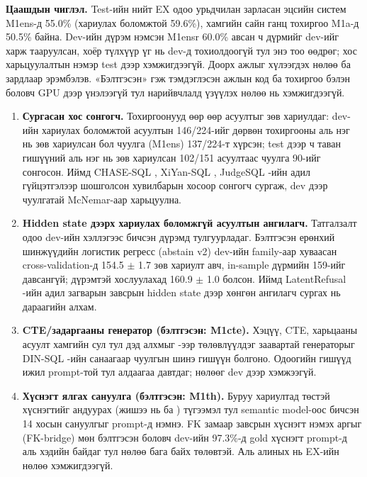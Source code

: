\textbf{Цаашдын чиглэл.} Test-ийн нийт EX одоо урьдчилан зарласан эцсийн систем M1ens-д 55.0\% (хариулах боломжтой
59.6\%), хамгийн сайн ганц тохиргоо M1a-д 50.5\% байна. Dev-ийн дүрэм нэмсэн M1ensr 60.0\% авсан ч дүрмийг dev-ийг харж
тааруулсан, хоёр түлхүүр үг нь dev-д тохиолдоогүй тул энэ тоо өөдрөг; хос харьцуулалтын нэмэр test дээр хэмжигдээгүй.
Доорх ажлыг хүлээгдэх нөлөө ба зардлаар эрэмбэлэв.
«Бэлтгэсэн» гэж тэмдэглэсэн ажлын код ба тохиргоо бэлэн боловч GPU дээр үнэлээгүй тул нарийвчлалд үзүүлэх нөлөө нь
хэмжигдээгүй.
\begin{enumerate}
  \item \textbf{Сургасан хос сонгогч.} Тохиргоонууд өөр өөр асуултыг зөв хариулдаг: dev-ийн хариулах боломжтой асуултын
        146/224-ийг дөрвөн тохиргооны аль нэг нь зөв хариулсан бол чуулга (M1ens) 137/224-т хүрсэн; test дээр ч таван
        гишүүний аль нэг нь зөв хариулсан 102/151 асуултаас чуулга 90-ийг сонгосон. Иймд CHASE-SQL
        \cite{pourreza_2024_chase_sql}, XiYan-SQL \cite{liu_2025_xiyan_sql}, JudgeSQL \cite{bai_2025_judgesql}-ийн адил
        гүйцэтгэлээр шошголсон хувилбарын хосоор сонгогч сургаж, dev дээр чуулгатай McNemar-аар харьцуулна.
  \item \textbf{Hidden state дээрх хариулах боломжгүй асуултын ангилагч.} Татгалзалт одоо dev-ийн хэллэгээс бичсэн
        дүрэмд тулгуурладаг. Бэлтгэсэн ерөнхий шинжүүдийн логистик регресс (abstain v2) dev-ийн family-аар хуваасан
        cross-validation-д 154.5 $\pm$ 1.7 зөв хариулт авч, in-sample дүрмийн 159-ийг давсангүй; дүрэмтэй хослуулахад
        160.9 $\pm$ 1.0 болсон. Иймд LatentRefusal \cite{ren_2026_latentrefusal}-ийн адил загварын завсрын hidden state
        дээр хөнгөн ангилагч сургах нь дараагийн алхам.
  \item \textbf{CTE/задаргааны генератор (бэлтгэсэн: M1cte).} Хэцүү, CTE, харьцааны асуулт хамгийн сул тул дэд алхмыг
        -ээр төлөвлүүлдэг заавартай генераторыг DIN-SQL \cite{pourreza_2023_din_sql}-ийн санаагаар чуулгын
        шинэ гишүүн болгоно. Одоогийн гишүүд ижил prompt-той тул алдаагаа давтдаг; нөлөөг dev дээр хэмжээгүй.
  \item \textbf{Хүснэгт ялгах сануулга (бэлтгэсэн: M1th).} Буруу хариултад төстэй хүснэгтийг андуурах (жишээ нь
         ба ) түгээмэл тул semantic model-оос бичсэн 14 хосын сануулгыг
        prompt-д нэмнэ. FK замаар завсрын хүснэгт нэмэх аргыг (FK-bridge) мөн бэлтгэсэн боловч dev-ийн 97.3\%-д gold
        хүснэгт prompt-д аль хэдийн байдаг тул нөлөө бага байх төлөвтэй. Аль алиных нь EX-ийн нөлөө хэмжигдээгүй.

\end{enumerate}
